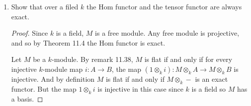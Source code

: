 \documentclass[11pt,oneside,english]{amsart}
\theoremstyle{definition}
\begin{document}
\begin{enumerate}[leftmargin=*]
\begin{enumerate}
\pagebreak

\item Show that $R/I \otimes_R M \cong M/IM$.

\begin{proof}
Consider the short exact sequence:

\begin{center}
\end{center}
Recall that the tensor functor is right exact. So if we apply $-\otimes_R M$ to our sequence, we get:

\begin{center}
\end{center}

By Lemma 10.22, $R\otimes_R M\cong M$ via $a\otimes m\mapsto am$ so the map $I\otimes_R M\mapsto M$ is given by the same mapping, but this means that the image of the map is $IM$. Thus, by exactness, $(R/I)\otimes_R M\cong M/IM$.
\end{proof}

\item There is an $R$-module map $I \otimes_R M \longrightarrow IM$ induced by the $R$-bilinear map $(a,m) \mapsto am$. This map is always clearly surjective; must it be injective?

No. Suppose $am_1=am_2$. Then we would have injectivity if and only if $a\otimes m_1=a\otimes m_2$, i.e. $a\otimes (m_1-m_2)$. But this would only hold if $a=0$ or $m_1=m_2$ which will not always be the case. A similar argument can be made if we instead suppose $a_1m=a_2m$.
\end{enumerate}

\item Show that over a filed $k$ the Hom functor and the tensor functor are always exact.

\begin{proof}
Since $k$ is a field, $M$ is a free module. Any free module is projective, and so by Theorem 11.4 the Hom functor is exact.

Let $M$ be a $k$-module. By remark 11.38, $M$ is flat if and only if for every injective $k$-module map $i:A\to B$, the map $(1\otimes_ki):M\otimes_kA\to M\otimes_kB$ is injective. And by definition $M$ is flat if and only if $M\otimes_k-$ is an exact functor. But the map $1\otimes_ki$ is injective in this case since $k$ is a field so $M$ has a basis. 
\end{proof}


\end{enumerate}
\end{document}
